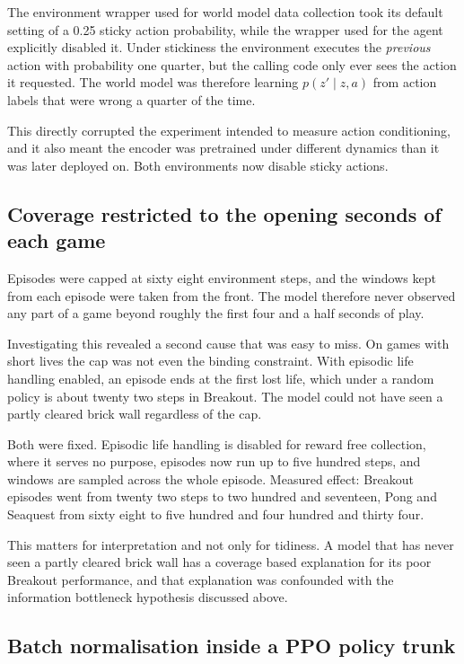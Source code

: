 \documentclass[11pt,a4paper]{article}
\begin{document}
The environment wrapper used for world model data collection took its default
setting of a 0.25 sticky action probability, while the wrapper used for the agent
explicitly disabled it. Under stickiness the environment executes the
\emph{previous} action with probability one quarter, but the calling code only ever
sees the action it requested. The world model was therefore learning $p(z' \mid z,
a)$ from action labels that were wrong a quarter of the time.

This directly corrupted the experiment intended to measure action conditioning, and
it also meant the encoder was pretrained under different dynamics than it was
later deployed on. Both environments now disable sticky actions.

\subsection{Coverage restricted to the opening seconds of each game}

Episodes were capped at sixty eight environment steps, and the windows kept from
each episode were taken from the front. The model therefore never observed any part
of a game beyond roughly the first four and a half seconds of play.

Investigating this revealed a second cause that was easy to miss. On games with
short lives the cap was not even the binding constraint. With episodic life
handling enabled, an episode ends at the first lost life, which under a random
policy is about twenty two steps in Breakout. The model could not have seen a
partly cleared brick wall regardless of the cap.

Both were fixed. Episodic life handling is disabled for reward free collection,
where it serves no purpose, episodes now run up to five hundred steps, and windows
are sampled across the whole episode. Measured effect: Breakout episodes went from
twenty two steps to two hundred and seventeen, Pong and Seaquest from sixty eight
to five hundred and four hundred and thirty four.

This matters for interpretation and not only for tidiness. A model that has never
seen a partly cleared brick wall has a coverage based explanation for its poor
Breakout performance, and that explanation was confounded with the information
bottleneck hypothesis discussed above.

\subsection{Batch normalisation inside a PPO policy trunk}
\end{document}
